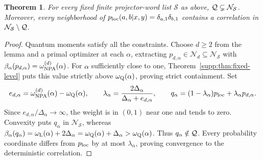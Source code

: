\documentclass[11pt]{article}
\newtheorem{theorem}{Theorem}
\theoremstyle{remark}\newtheorem{remark}[theorem]{Remark}
\begin{document}
\begin{theorem}
\label{supp:thm:set-separation}\label{supp:cor:local-accumulation}
For every fixed finite projector-word list $\mathcal S$ as above,
$\mathcal Q\subsetneq\mathcal N_{\mathcal S}$. Moreover, every neighborhood of
$p_{\rm loc}(a,b|x,y)=\delta_{a,1}\delta_{b,1}$ contains a correlation
in $\mathcal N_{\mathcal S}\setminus\mathcal Q$.
\end{theorem}
\begin{proof}
Quantum moments satisfy all the constraints. Choose $d\geq2$ from the
lemma and a primal optimizer at each $\alpha$, extracting
$p_{d,\alpha}\in\mathcal N_d\subseteq\mathcal N_{\mathcal S}$ with
$\beta_\alpha(p_{d,\alpha})=\omega_{\rm NPA}^{(d)}(\alpha)$.
For $\alpha$ sufficiently close to one, Theorem~\ref{supp:thm:fixed-level}
puts this value strictly above $\omega_{\rm Q}(\alpha)$, proving strict
containment. Set
\begin{equation}
e_{d,\alpha}=\omega_{\rm NPA}^{(d)}(\alpha)-\omega_{\rm Q}(\alpha),
\qquad \lambda_\alpha=\frac{2\Delta_\alpha}{\Delta_\alpha+e_{d,\alpha}},
\qquad q_\alpha=(1-\lambda_\alpha)p_{\rm loc}
+\lambda_\alpha p_{d,\alpha}.
\label{supp:eq:mixing-weight}
\end{equation}
Since $e_{d,\alpha}/\Delta_\alpha\to\infty$, the weight is in $(0,1)$
near one and tends to zero. Convexity puts $q_\alpha$ in
$\mathcal N_{\mathcal S}$, whereas
$\beta_\alpha(q_\alpha)=\omega_{\rm L}(\alpha)+2\Delta_\alpha
=\omega_{\rm Q}(\alpha)+\Delta_\alpha>\omega_{\rm Q}(\alpha)$.
Thus $q_\alpha\notin\mathcal Q$. Every probability coordinate differs from
$p_{\rm loc}$ by at most $\lambda_\alpha$, proving convergence to the
deterministic correlation.
\end{proof}
\end{document}
